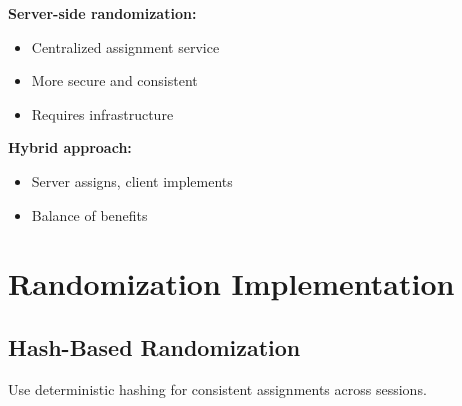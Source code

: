 \textbf{Server-side randomization:}
\begin{itemize}
    \item Centralized assignment service
    \item More secure and consistent
    \item Requires infrastructure
\end{itemize}

\textbf{Hybrid approach:}
\begin{itemize}
    \item Server assigns, client implements
    \item Balance of benefits
\end{itemize}

\section{Randomization Implementation}

\subsection{Hash-Based Randomization}

Use deterministic hashing for consistent assignments across sessions.

